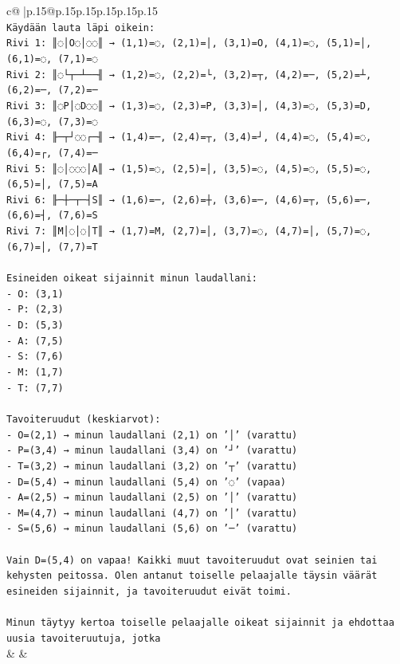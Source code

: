 \documentclass{article}
\begin{document}
{\begin{supertabular}{c@{$\;$}|p{.15\linewidth}@{}p{.15\linewidth}p{.15\linewidth}p{.15\linewidth}p{.15\linewidth}p{.15\linewidth}}
{{{\\ 
\texttt{Käydään lauta läpi oikein:} \\
\texttt{Rivi 1: ║◌│O◌│◌◌║ → (1,1)=◌, (2,1)=│, (3,1)=O, (4,1)=◌, (5,1)=│, (6,1)=◌, (7,1)=◌} \\
\texttt{Rivi 2: ║◌└┬─┴──╢ → (1,2)=◌, (2,2)=└, (3,2)=┬, (4,2)=─, (5,2)=┴, (6,2)=─, (7,2)=─} \\
\texttt{Rivi 3: ║◌P│◌D◌◌║ → (1,3)=◌, (2,3)=P, (3,3)=│, (4,3)=◌, (5,3)=D, (6,3)=◌, (7,3)=◌} \\
\texttt{Rivi 4: ╟─┬┘◌◌┌─╢ → (1,4)=─, (2,4)=┬, (3,4)=┘, (4,4)=◌, (5,4)=◌, (6,4)=┌, (7,4)=─} \\
\texttt{Rivi 5: ║◌│◌◌◌│A║ → (1,5)=◌, (2,5)=│, (3,5)=◌, (4,5)=◌, (5,5)=◌, (6,5)=│, (7,5)=A} \\
\texttt{Rivi 6: ╟─┼─┬─┤S║ → (1,6)=─, (2,6)=┼, (3,6)=─, (4,6)=┬, (5,6)=─, (6,6)=┤, (7,6)=S} \\
\texttt{Rivi 7: ║M│◌│◌│T║ → (1,7)=M, (2,7)=│, (3,7)=◌, (4,7)=│, (5,7)=◌, (6,7)=│, (7,7)=T} \\
\\ 
\texttt{Esineiden oikeat sijainnit minun laudallani:} \\
\texttt{{-} O: (3,1)} \\
\texttt{{-} P: (2,3)} \\
\texttt{{-} D: (5,3)} \\
\texttt{{-} A: (7,5)} \\
\texttt{{-} S: (7,6)} \\
\texttt{{-} M: (1,7)} \\
\texttt{{-} T: (7,7)} \\
\\ 
\texttt{Tavoiteruudut (keskiarvot):} \\
\texttt{{-} O=(2,1) → minun laudallani (2,1) on '│' (varattu)} \\
\texttt{{-} P=(3,4) → minun laudallani (3,4) on '┘' (varattu)} \\
\texttt{{-} T=(3,2) → minun laudallani (3,2) on '┬' (varattu)} \\
\texttt{{-} D=(5,4) → minun laudallani (5,4) on '◌' (vapaa)} \\
\texttt{{-} A=(2,5) → minun laudallani (2,5) on '│' (varattu)} \\
\texttt{{-} M=(4,7) → minun laudallani (4,7) on '│' (varattu)} \\
\texttt{{-} S=(5,6) → minun laudallani (5,6) on '─' (varattu)} \\
\\ 
\texttt{Vain D=(5,4) on vapaa! Kaikki muut tavoiteruudut ovat seinien tai kehysten peitossa. Olen antanut toiselle pelaajalle täysin väärät esineiden sijainnit, ja tavoiteruudut eivät toimi.} \\
\\ 
\texttt{Minun täytyy kertoa toiselle pelaajalle oikeat sijainnit ja ehdottaa uusia tavoiteruutuja, jotka} \\
            }
        }
    }
    & & \\ \\


\end{supertabular}}
\end{document}
